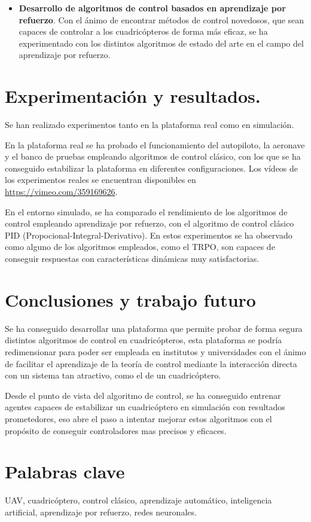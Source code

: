 \begin{itemize}
	
	\item \textbf{Desarrollo de algoritmos de control basados en aprendizaje por refuerzo}. Con el ánimo de encontrar métodos de control novedosos, que sean capaces de controlar a los cuadricópteros de forma más eficaz, se ha experimentado con los distintos algoritmos de estado del arte en el campo del aprendizaje por refuerzo.
	
\end{itemize}


\section*{Experimentación y resultados.}
Se han realizado experimentos tanto en la plataforma real como en simulación.

En la plataforma real se ha probado el funcionamiento del autopiloto, la aeronave y el banco de pruebas empleando algoritmos de control clásico, con los que se ha conseguido estabilizar la plataforma en diferentes configuraciones.  Los vídeos de los experimentos reales se encuentran disponibles en \url{https://vimeo.com/359169626}.

En el entorno simulado, se ha comparado el rendimiento de los algoritmos de control empleando aprendizaje por refuerzo, con el algoritmo de control clásico PID (Propocional-Integral-Derivativo). En estos experimentos se ha observado como alguno de los algoritmos empleados, como el TRPO, son capaces de conseguir respuestas con características dinámicas muy satisfactorias. 

\section*{Conclusiones y trabajo futuro}
Se ha conseguido desarrollar una plataforma que permite probar de forma segura distintos algoritmos de control en cuadricópteros, esta plataforma se podría redimensionar para poder ser empleada en institutos y universidades con el ánimo de facilitar el aprendizaje de la teoría de control mediante la interacción directa con un sistema tan atractivo, como el de un cuadricóptero.

Desde el punto de vista del algoritmo de control, se ha conseguido entrenar agentes capaces de estabilizar un cuadricóptero en simulación con resultados prometedores, eso abre el paso a intentar mejorar estos algoritmos con el propósito de conseguir controladores mas precisos y eficaces.

\section*{Palabras clave}
UAV, cuadricóptero, control clásico, aprendizaje automático, inteligencia artificial, aprendizaje por refuerzo, redes neuronales.
